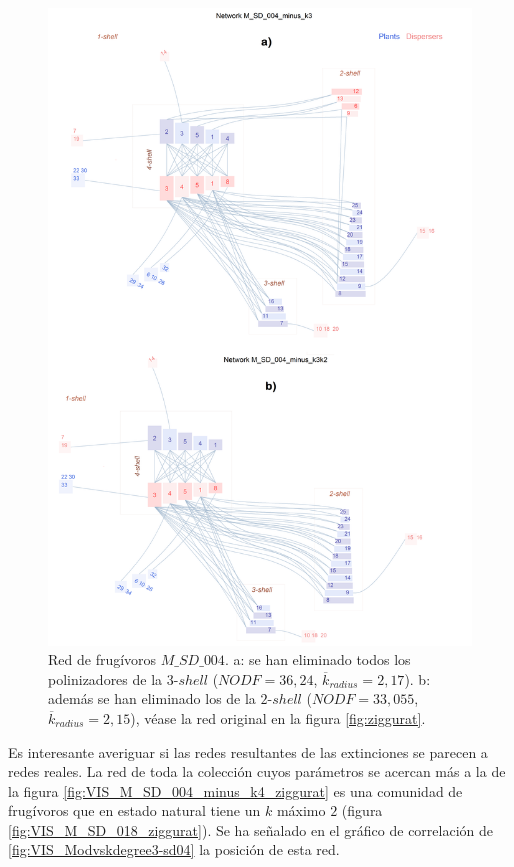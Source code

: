 \clearpage
\begin{figure}[ht!]
\centering
\includegraphics[scale=0.15]{Figures/VIS_M_SD_004_minus_k3k2_ziggurat.png}
\caption {Red de frugívoros $M\_SD\_004$. a: se han eliminado todos los polinizadores de la $3$-$shell$ ($NODF = 36,24$, $\overline k_{radius} = 2,17$). b: además se han eliminado los de la $2$-$shell$ ($NODF = 33,055$, $\overline k_{radius} = 2,15$), véase la red original en la figura \ref{fig:ziggurat}.} 
\label{fig:VIS_M_SD_004_minus_k3k2_ziggurat}
\end{figure}

\clearpage
Es interesante averiguar si las redes resultantes de las extinciones se parecen a redes reales. La red de toda la colección cuyos parámetros se acercan más a la de la figura \ref{fig:VIS_M_SD_004_minus_k4_ziggurat} es una comunidad de frugívoros que en estado natural tiene un $k$ máximo $2$ (figura \ref{fig:VIS_M_SD_018_ziggurat}). Se ha señalado en el gráfico de correlación de \ref{fig:VIS_Modvskdegree3-sd04} la posición de esta red.

